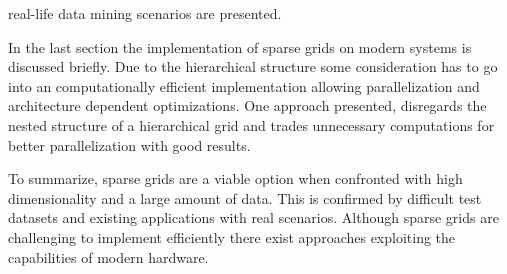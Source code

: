 \documentclass[a4paper]{scrartcl}
\begin{document}
real-life data mining scenarios are presented.
\par
In the last section the implementation of sparse grids on modern
systems is discussed briefly. Due to the hierarchical structure some
consideration has to go into an computationally efficient
implementation allowing
parallelization and architecture dependent optimizations.
One approach presented, disregards the nested structure of a hierarchical grid
and trades unnecessary computations for better parallelization with good
results.
\par
To summarize, sparse grids are a viable option when confronted with
high dimensionality and a large amount of data. This is confirmed by
difficult test datasets and existing applications with real scenarios. Although
sparse grids are challenging to implement efficiently there exist approaches
exploiting the capabilities of modern hardware.
\end{document}

